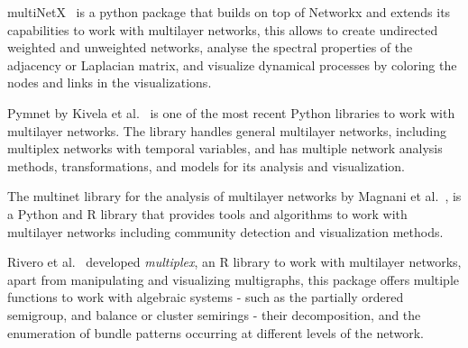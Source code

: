 multiNetX~\cite{kouvaris2015pattern} is a python package that builds on top of Networkx and extends its capabilities to work with multilayer networks, this allows to create undirected weighted and unweighted networks, analyse the spectral properties of the adjacency or Laplacian matrix, and visualize dynamical processes by coloring the nodes and links in the visualizations. 

Pymnet by Kivela et al.~\cite{kivela2018pymnet} is one of the most recent Python libraries to work with multilayer networks. The library handles general multilayer networks, including multiplex networks with temporal variables, and has multiple network analysis methods, transformations, and models for its analysis and visualization.

The multinet library for the analysis of multilayer networks by Magnani et al.~\cite{magnani2020multiplex}, is a Python and R library that provides tools and algorithms to work with multilayer networks including community detection and visualization methods.

Rivero et al.~\cite{rivero2020algebraic} developed \textit{multiplex}, an R library to work with multilayer networks, apart from manipulating and visualizing multigraphs, this package offers multiple functions to work with algebraic systems - such as the partially ordered semigroup, and balance or cluster semirings - their decomposition, and the enumeration of bundle patterns occurring at different levels of the network. 